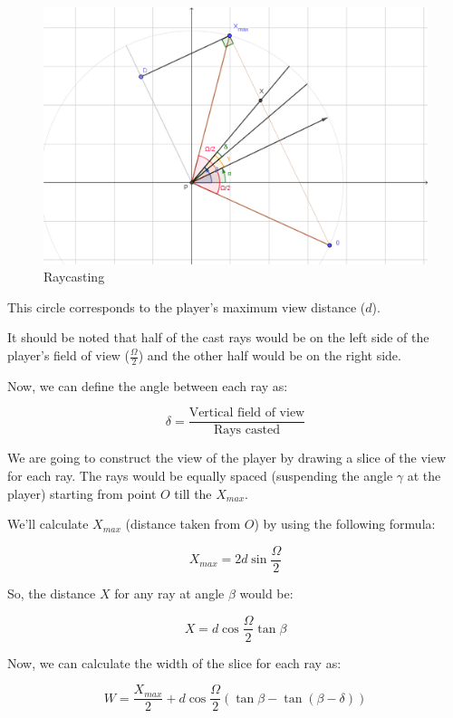 \begin{figure}[!ht]
    \centering
    \includegraphics[width=\textwidth]{./images/raycasting.png}
    \caption{Raycasting}
    \label{fig:rays}
\end{figure}

This circle corresponds to the player's maximum view distance ($d$).

It should be noted that half of the cast rays would be on the left side of the player's field of view ($\frac{\Omega}{2}$) and the other half would be on the right side. 

Now, we can define the angle between each ray as:

\begin{equation}
	\delta = \frac{\text{Vertical field of view}}{\text{Rays casted}}
\end{equation}

We are going to construct the view of the player by drawing a slice of the view for each ray. The rays would be equally spaced (suspending the angle $\gamma$ at the player) starting from point $O$ till the $X_{max}$.

We'll calculate $X_{max}$ (distance taken from $O$) by using the following formula:

\begin{equation}
	X_{max} = 2 d \sin\frac{\Omega}{2}
\end{equation}

So, the distance $X$ for any ray at angle $\beta$ would be:

\begin{equation}
	X = d \cos\frac{\Omega}{2} \tan\beta
\end{equation}

Now, we can calculate the width of the slice for each ray as:

\begin{equation}
	W = \frac{X_{max}}{2} + d \cos\frac{\Omega}{2} (\tan\beta - \tan(\beta - \delta))
\end{equation}

\newpage

